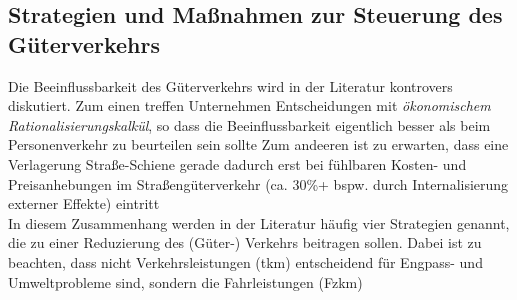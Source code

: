 % 
\subsection{Strategien und Maßnahmen zur Steuerung des Güterverkehrs}
\label{_Toc347467542}
\label{_Ref364897466}
\label{_Toc365801596}
\label{_Ref366763232}
\label{_Toc366766095}
\label{_Toc366775289}
Die Beeinflussbarkeit des Güterverkehrs wird in der Literatur kontrovers diskutiert. Zum einen treffen Unternehmen Entscheidungen mit \emph{ökonomische}\emph{m}\emph{ Rationalisierungskalkül}, so dass die Beeinflussbarkeit eigentlich besser als beim Personenverkehr zu beurteilen sein sollte  \autocites[][]{bib.739} Zum andeeren ist zu erwarten, dass eine Verlagerung Straße-Schiene gerade dadurch erst bei fühlbaren Kosten- und Preisanhebungen im Straßengüterverkehr (ca. 30\%+ bspw. durch Internalisierung externer Effekte) eintritt  \autocites[][]{bib.739}~\\
In diesem Zusammenhang werden in der Literatur häufig vier Strategien genannt, die zu einer Reduzierung des (Güter-) Verkehrs 
\label{_Toc347467543}beitragen sollen. Dabei ist zu beachten, dass nicht Verkehrsleistungen (tkm) entscheidend für Engpass- und Umweltprobleme sind, sondern die Fahrleistungen (Fzkm)  \autocites[][]{bib.739} ~\\

